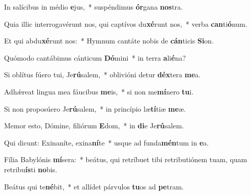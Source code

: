 \item In salícibus in médio \textbf{e}jus,~* suspéndimus \textbf{ór}gana \textbf{nos}tra.
\item Quia illic interrogavérunt nos, qui captívos du\textbf{xé}runt nos,~* verba \textbf{can}ti\textbf{ó}num.
\item Et qui abdu\textbf{xé}runt nos:~* Hymnum cantáte nobis de \textbf{cán}ticis \textbf{Si}on.
\item Quómodo cantábimus cánticum \textbf{Dó}mini~* in terra \textbf{a}li\textbf{é}na?
\item Si oblítus fúero tui, Je\textbf{rú}salem,~* oblivióni detur \textbf{déx}tera \textbf{me}a.
\item Adhǽreat lingua mea fáucibus \textbf{me}is,~* si non me\textbf{mí}nero \textbf{tu}i.
\item Si non proposúero Je\textbf{rú}salem,~* in princípio læ\textbf{tí}tiæ \textbf{me}æ.
\item Memor esto, Dómine, filiórum \textbf{E}dom,~* in \textbf{di}e Je\textbf{rú}salem.
\item Qui dicunt: Exinaníte, exina\textbf{ní}te~* usque ad funda\textbf{mén}tum in \textbf{e}a.
\item Fília Babylónis \textbf{mí}sera:~* beátus, qui retríbuet tibi retributiónem tuam, quam retribu\textbf{ís}ti \textbf{no}bis.
\item Beátus qui te\textbf{né}bit,~* et allídet párvulos \textbf{tu}os ad \textbf{pe}tram.
